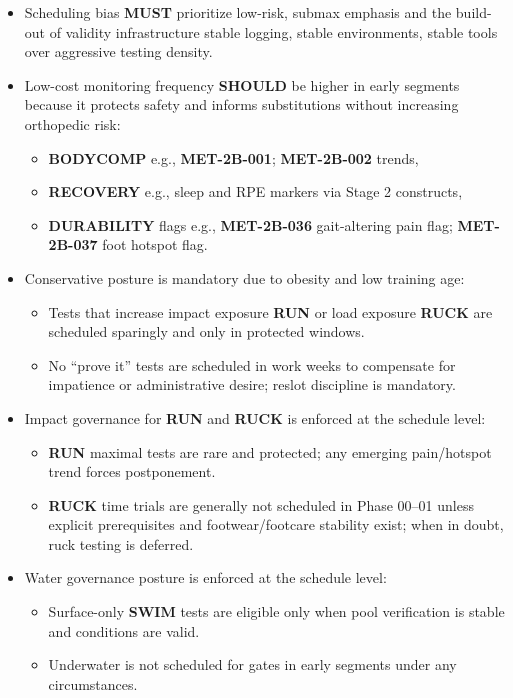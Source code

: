 \documentclass[10pt]{article}
\begin{document}
\begin{itemize}
\item Scheduling bias \textbf{MUST} prioritize low-risk, submax emphasis and the build-out of validity infrastructure stable logging, stable environments, stable tools over aggressive testing density.
\item Low-cost monitoring frequency \textbf{SHOULD} be higher in early segments because it protects safety and informs substitutions without increasing orthopedic risk:
  \begin{itemize}
  \item \textbf{BODYCOMP} e.g., \textbf{MET-2B-001}; \textbf{MET-2B-002} trends,
  \item \textbf{RECOVERY} e.g., sleep and RPE markers via Stage 2 constructs,
  \item \textbf{DURABILITY} flags e.g., \textbf{MET-2B-036} gait-altering pain flag; \textbf{MET-2B-037} foot hotspot flag.
  \end{itemize}
\item Conservative posture is mandatory due to obesity and low training age:
  \begin{itemize}
  \item Tests that increase impact exposure \textbf{RUN} or load exposure \textbf{RUCK} are scheduled sparingly and only in protected windows.
  \item No “prove it” tests are scheduled in work weeks to compensate for impatience or administrative desire; reslot discipline is mandatory.
  \end{itemize}
\item Impact governance for \textbf{RUN} and \textbf{RUCK} is enforced at the schedule level:
  \begin{itemize}
  \item \textbf{RUN} maximal tests are rare and protected; any emerging pain/hotspot trend forces postponement.
  \item \textbf{RUCK} time trials are generally not scheduled in Phase 00–01 unless explicit prerequisites and footwear/footcare stability exist; when in doubt, ruck testing is deferred.
  \end{itemize}
\item Water governance posture is enforced at the schedule level:
  \begin{itemize}
  \item Surface-only \textbf{SWIM} tests are eligible only when pool verification is stable and conditions are valid.
  \item Underwater is not scheduled for gates in early segments under any circumstances.
  \end{itemize}
\end{itemize}
\end{document}
